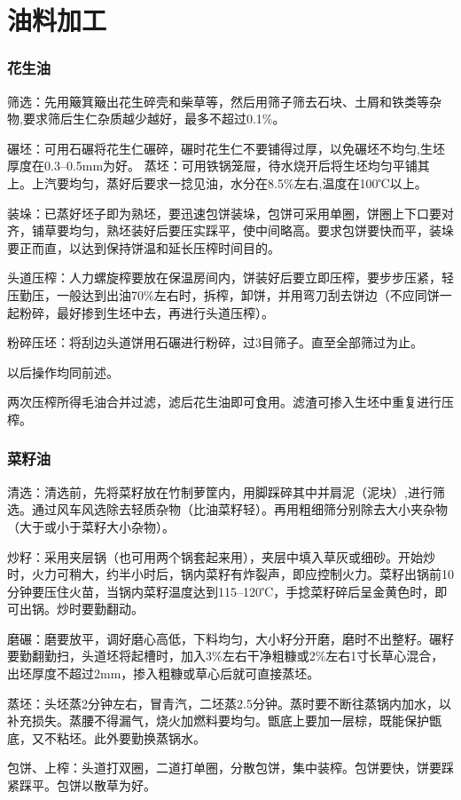 \documentclass{ctexbook}
\begin{document}
\chapter{油料加工}
\subsection{花生油}
筛选：先用簸箕簸出花生碎壳和柴草等，然后用筛子筛去石块、土屑和铁类等杂物,要求筛后生仁杂质越少越好，最多不超过0.1\%。

碾坯：可用石碾将花生仁碾碎，碾时花生仁不要铺得过厚，以免碾坯不均匀,生坯厚度在0.3--0.5mm为好。
蒸坯：可用铁锅笼屉，待水烧开后将生坯均匀平铺其上。上汽要均匀，蒸好后要求一捻见油，水分在8.5\%左右,温度在100℃以上。

装垛：已蒸好坯子即为熟坯，要迅速包饼装垛，包饼可采用单圈，饼圈上下口要对齐，铺草要均匀，熟坯装好后要压实踩平，使中间略高。要求包饼要快而平，装垛要正而直，以达到保持饼温和延长压榨时间目的。

头道压榨：人力螺旋榨要放在保温房间内，饼装好后要立即压榨，要步步压紧，轻压勤压，一般达到出油70\%左右时，拆榨，卸饼，并用弯刀刮去饼边（不应同饼一起粉碎，最好掺到生坯中去，再进行头道压榨）。

粉碎压坯：将刮边头道饼用石碾进行粉碎，过3目筛子。直至全部筛过为止。

以后操作均同前述。

两次压榨所得毛油合并过滤，滤后花生油即可食用。滤渣可掺入生坯中重复进行压榨。
\subsection{菜籽油}
清选：清选前，先将菜籽放在竹制萝筐内，用脚踩碎其中并肩泥（泥块）,进行筛选。通过风车风选除去轻质杂物（比油菜籽轻）。再用粗细筛分别除去大小夹杂物（大于或小于菜籽大小杂物）。

炒籽：采用夹层锅（也可用两个锅套起来用），夹层中填入草灰或细砂。开始炒时，火力可稍大，约半小时后，锅内菜籽有炸裂声，即应控制火力。菜籽出锅前10分钟要压住火苗，当锅内菜籽温度达到115--120℃，手捻菜籽碎后呈金黄色时，即可出锅。炒时要勤翻动。

磨碾：磨要放平，调好磨心高低，下料均匀，大小籽分开磨，磨时不出整籽。碾籽要勤翻勤扫，头道坯将起槽时，加入3\%左右干净粗糠或2\%左右1寸长草心混合，出坯厚度不超过2mm，掺入粗糠或草心后就可直接蒸坯。

蒸坯：头坯蒸2分钟左右，冒青汽，二坯蒸2.5分钟。蒸时要不断往蒸锅内加水，以补充损失。蒸腰不得漏气，烧火加燃料要均匀。甑底上要加一层棕，既能保护甑底，又不粘坯。此外要勤换蒸锅水。

包饼、上榨：头道打双圈，二道打单圈，分散包饼，集中装榨。包饼要快，饼要踩紧踩平。包饼以散草为好。
\end{document}
